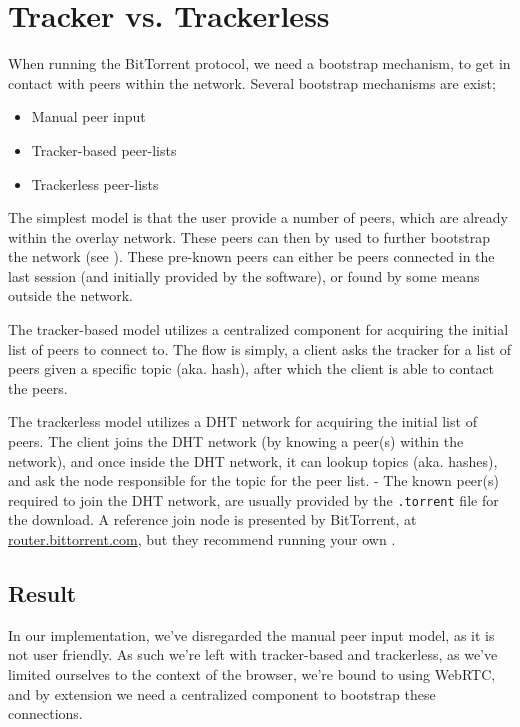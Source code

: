 \section{Tracker vs. Trackerless}
\label{sec:trackerless}
When running the BitTorrent protocol, we need a bootstrap mechanism, to get in
contact with peers within the network. Several bootstrap mechanisms are exist;
\begin{itemize}
\item Manual peer input
\item Tracker-based peer-lists
\item Trackerless peer-lists
\end{itemize}
The simplest model is that the user provide a number of peers, which are
already within the overlay network. These peers can then by used to further
bootstrap the network (see \citep{bittorrent:bep11}). These pre-known peers
can either be peers connected in the last session (and initially provided by
the software), or found by some means outside the network.

The tracker-based model utilizes a centralized component for acquiring the
initial list of peers to connect to. The flow is simply, a client asks the
tracker for a list of peers given a specific topic (aka. hash), after which the
client is able to contact the peers.

The trackerless model utilizes a \acs{DHT} network for acquiring the initial list of 
peers. The client joins the \acs{DHT} network (by knowing a peer(s) within the network),
and once inside the \acs{DHT} network, it can lookup topics (aka. hashes), and ask
the node responsible for the topic for the peer list.
\newline
- The known peer(s) required to join the \acs{DHT} network, are usually provided by
the \verb|.torrent| file for the download. A reference join node is presented
by BitTorrent, at \url{router.bittorrent.com}, but they recommend running your
own \citep{bittorrent:bep05}.

\subsection{Result}
In our implementation, we've disregarded the manual peer input model, as it is
not user friendly. As such we're left with tracker-based and trackerless, as 
we've limited ourselves to the context of the browser, we're bound to using 
WebRTC, and by extension we need a centralized component to bootstrap these
connections. 

